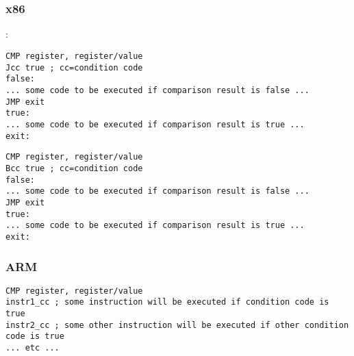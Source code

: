 \chapter{}
\label{sec:Jcc}





\section{\Conclusion{}}

\subsection{x86}

:

\begin{lstlisting}[caption=x86]
CMP register, register/value
Jcc true ; cc=condition code
false:
... some code to be executed if comparison result is false ...
JMP exit 
true:
... some code to be executed if comparison result is true ...
exit:
\end{lstlisting}

\ifdefined\IncludeARM
\begin{lstlisting}[caption=ARM]
CMP register, register/value
Bcc true ; cc=condition code
false:
... some code to be executed if comparison result is false ...
JMP exit 
true:
... some code to be executed if comparison result is true ...
exit:
\end{lstlisting}
\fi

\ifdefined\IncludeARM
\subsection{ARM}


\begin{lstlisting}[caption=ARM (\ARMMode)]
CMP register, register/value
instr1_cc ; some instruction will be executed if condition code is true
instr2_cc ; some other instruction will be executed if other condition code is true
... etc ...
\end{lstlisting}

